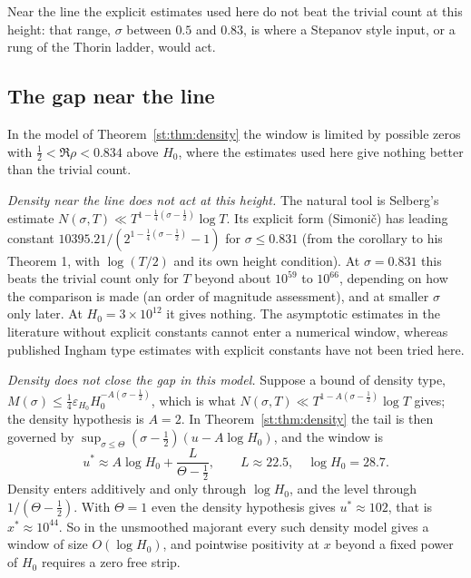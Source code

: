 Near the line the explicit estimates used here do not beat the trivial count at this height: that range, $\sigma$ between $0.5$ and $0.83$, is where a Stepanov style input, or a rung of the Thorin ladder, would act.

\subsection{The gap near the line}
In the model of Theorem~\ref{st:thm:density} the window is limited by possible zeros with $\tfrac12<\Re\rho<0.834$ above $H_0$, where the estimates used here give nothing better than the trivial count.

\emph{Density near the line does not act at this height.} The natural tool is Selberg's estimate $N(\sigma,T)\ll T^{1-\frac14(\sigma-\frac12)}\log T$. Its explicit form (Simoni\v{c}) has leading constant $10395.21/(2^{1-\frac14(\sigma-\frac12)}-1)$ for $\sigma\le0.831$ (from the corollary to his Theorem 1, with $\log(T/2)$ and its own height condition). At $\sigma=0.831$ this beats the trivial count only for $T$ beyond about $10^{59}$ to $10^{66}$, depending on how the comparison is made (an order of magnitude assessment), and at smaller $\sigma$ only later. At $H_0=3\times10^{12}$ it gives nothing. The asymptotic estimates in the literature without explicit constants cannot enter a numerical window, whereas published Ingham type estimates with explicit constants have not been tried here.

\emph{Density does not close the gap in this model.} Suppose a bound of density type, $M(\sigma)\le\tfrac14\varepsilon_{H_0}H_0^{-A(\sigma-\frac12)}$, which is what $N(\sigma,T)\ll T^{1-A(\sigma-\frac12)}\log T$ gives; the density hypothesis is $A=2$. In Theorem~\ref{st:thm:density} the tail is then governed by $\sup_{\sigma\le\Theta}(\sigma-\tfrac12)(u-A\log H_0)$, and the window is
\begin{equation}\label{st:eq:window}
u^*\approx A\log H_0+\frac{L}{\Theta-\tfrac12},\qquad L\approx22.5,\quad\log H_0=28.7 .
\end{equation}
Density enters additively and only through $\log H_0$, and the level through $1/(\Theta-\tfrac12)$. With $\Theta=1$ even the density hypothesis gives $u^*\approx102$, that is $x^*\approx10^{44}$. So in the unsmoothed majorant every such density model gives a window of size $O(\log H_0)$, and pointwise positivity at $x$ beyond a fixed power of $H_0$ requires a zero free strip.

